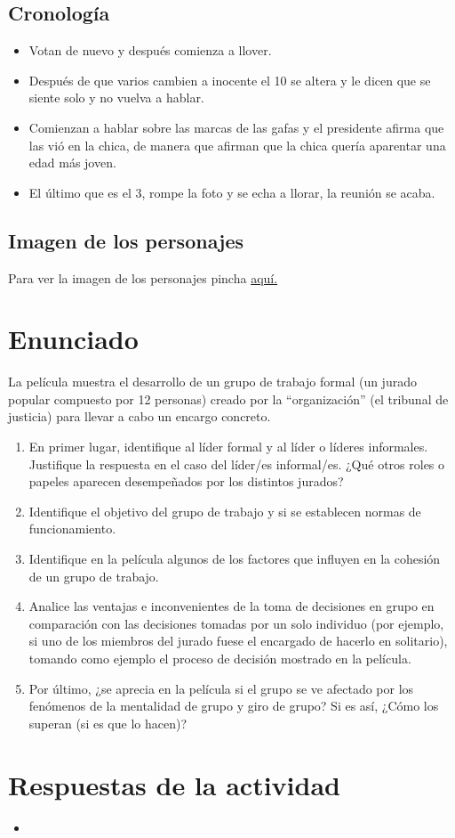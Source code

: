 \documentclass{article}
\begin{document}
\subsection{Cronología}
\begin{itemize}
    \item Votan de nuevo y después comienza a llover.
    \item Después de que varios cambien a inocente el 10 se altera y le dicen que se siente solo y no vuelva a hablar.
    \item Comienzan a hablar sobre las marcas de las gafas y el presidente afirma que las vió en la chica, de manera que afirman que la chica quería aparentar una edad más joven.
    \item El último que es el 3, rompe la foto y se echa a llorar, la reunión se acaba.
\end{itemize}

\subsection{Imagen de los personajes}
Para ver la imagen de los personajes pincha \href{https://github.com/ElblogdeIsmael/ElblogdeIsmael.github.io/blob/main/Asignaturas/Tercer%20A%C3%B1o/DAE/PracticasDAE/ACT8/Plantilla-Practicas/images/imagenDaeAct8.pdf}{aquí.}

\section{Enunciado}

La película muestra el desarrollo de un grupo de trabajo formal (un jurado popular compuesto por 12
personas) creado por la “organización” (el tribunal de justicia) para llevar a cabo un encargo concreto.

\begin{enumerate}
    \item En primer lugar, identifique al líder formal y al líder o líderes informales. Justifique la respuesta en el caso del
    líder/es informal/es. ¿Qué otros roles o papeles aparecen desempeñados por los distintos jurados?
    \item Identifique el objetivo del grupo de trabajo y si se establecen normas de funcionamiento.
    \item Identifique en la película algunos de los factores que influyen en la cohesión de un grupo de trabajo.
    \item Analice las ventajas e inconvenientes de la toma de decisiones en grupo en comparación con las decisiones tomadas por un solo individuo (por ejemplo, si uno de los miembros del jurado fuese el encargado de hacerlo en solitario), tomando como ejemplo el proceso de decisión mostrado en la película.
    \item Por último, ¿se aprecia en la película si el grupo se ve afectado por los fenómenos de la mentalidad de grupo y giro de grupo? Si es así, ¿Cómo los superan (si es que lo hacen)?
\end{enumerate}

\section{Respuestas de la actividad}
\begin{itemize}
    \item 
\end{itemize}
\end{document}
